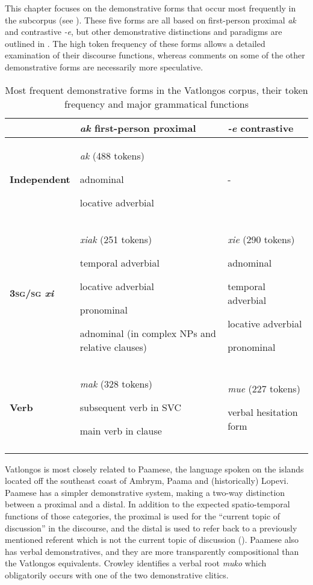 \documentclass[output=paper,colorlinks,citecolor=brown]{langscibook}
\begin{document}
This chapter focuses on the demonstrative forms that occur most frequently in the subcorpus (see ). These five forms are all based on first-person proximal \textit{ak} and contrastive \textit{-e}, but other demonstrative distinctions and paradigms are outlined in . The high token frequency of these forms allows a detailed examination of their discourse functions, whereas comments on some of the other demonstrative forms are necessarily more speculative.

\begin{table}
\caption{Most frequent demonstrative forms in the Vatlongos corpus, their token frequency and major grammatical functions}
\label{tab:ridge:1}
\begin{tabularx}{\textwidth}{lQQ}
\lsptoprule
& \textbf{\textit{ak} first-person proximal} & \textbf{\textit{-e} contrastive}\\
\midrule
\textbf{Independent} & \textit{ak} (488 tokens)

adnominal

locative adverbial & {}-\\

\tablevspace
\textbf{\textsc{3sg/sg} \textit{xi}} & \textit{xiak} (251 tokens)

temporal adverbial

locative adverbial

pronominal

adnominal (in complex NPs and relative clauses) & {\textit{xie} (290 tokens)}

adnominal

temporal adverbial

locative adverbial

pronominal\\
\tablevspace
\textbf{Verb} & {\textit{mak} (328 tokens)}

subsequent verb in SVC

main verb in clause & {\textit{mue} (227 tokens)}

verbal hesitation form\\
\lspbottomrule
\end{tabularx}
\end{table}

Vatlongos is most closely related to Paamese, the language spoken on the islands located off the southeast coast of Ambrym, Paama and (historically) Lopevi. Paamese has a simpler demonstrative system, making a two-way distinction between a proximal and a distal. In addition to the expected spatio-temporal functions of those categories, the proximal is used for the “current topic of discussion” in the discourse, and the distal is used to refer back to a previously mentioned referent which is not the current topic of discussion (\citealt[226-229]{Crowley1982}). Paamese also has verbal demonstratives, and they are more transparently compositional than the Vatlongos equivalents. Crowley identifies a verbal root \textit{muko} which obligatorily occurs with one of the two demonstrative clitics.
\end{document}
